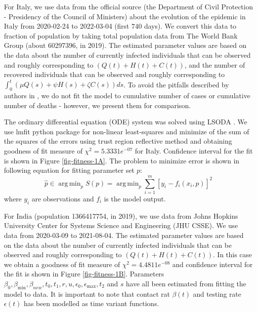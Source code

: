 \documentclass[10pt]{wlscirep}
\DeclareMathOperator*{\argmin}{arg\,min}
\begin{document}
For Italy, we use data from the official source (the Department of Civil Protection - Presidency of the Council of Ministers) about the evolution of the epidemic in Italy from 2020-02-24 to 2022-03-04 (first $740$ days). We convert this data to fraction of population by taking total population data from The World Bank Group (about 60297396, in 2019). The estimated parameter values are based on the data about the number of currently infected individuals that can be observed and roughly corresponding to $\left( Q(t) + H(t) + C(t)\right) $, and the number of recovered individuals that can be observed and roughly corresponding to $\int_{0}^{t}{\left( \mu Q(s) + \psi H(s) + \zeta  C(s) \right) ds}$. To avoid the pitfalls described by authors in \cite{doi:10.1098/rspb.2015.0347}, we do not fit the model to cumulative number of cases or cumulative number of deaths - however, we present them for comparison.

The ordinary differential equation (ODE) system was solved using LSODA \cite{doi:10.1137/0904010, HindmarshSep2005}. We use lmfit python package \cite{LMFIT} for non-linear least-squares and minimize of the sum of the squares of the errors using trust region reflective method and obtaining goodness of fit measure of $\chi^2= 5.3331e^{-07}$ for Italy. Confidence interval for the fit is shown in Figure \ref{fig-fitness-1A}. The problem to minimize error is shown in following equation for fitting parameter set $p$:
%
\begin{equation}
\hat{p} \in \argmin_p S(p) =  \argmin_p \sum_{i=1}^{m}{\left[y_i - f_i(x_i,p)\right]^2 }
\end{equation}
%
where $y_i$ are observations and $f_i$ is the model output.

For India (population 1366417754, in 2019), we use data from Johns Hopkins University Center for Systems Science and Engineering (JHU CSSE). We use data from 2020-03-09 to 2021-08-04. The estimated parameter values are based on the data about the number of currently infected individuals that can be observed and roughly corresponding to $\left( Q(t) + H(t) + C(t)\right) $. In this case we obtain a goodness of fit measure of $\chi^2= 4.4811e^{-08}$ and confidence interval for the fit is shown in Figure \ref{fig-fitness-1B}. Parameters $\beta_0, \beta_{\min}, \beta_{new}, t_0, t_1, r, u, \epsilon_0, \epsilon_{\max}, t_2$ and $s$ have all been estimated from fitting the model to data. It is important to note that contact rat $\beta(t)$ and testing rate $\epsilon(t)$ has been modelled as time variant functions.
\end{document}
